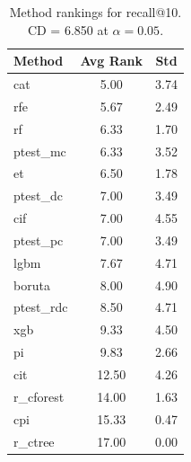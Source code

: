 \begin{table}[h]
\centering
\caption{Method rankings for recall@10. CD = 6.850 at $\alpha=0.05$.}
\label{tab:ranks_recall@10}
\begin{tabular}{lcc}
\toprule
Method & Avg Rank & Std \\
\midrule
cat & 5.00 & 3.74 \\
rfe & 5.67 & 2.49 \\
rf & 6.33 & 1.70 \\
ptest_mc & 6.33 & 3.52 \\
et & 6.50 & 1.78 \\
ptest_dc & 7.00 & 3.49 \\
cif & 7.00 & 4.55 \\
ptest_pc & 7.00 & 3.49 \\
lgbm & 7.67 & 4.71 \\
boruta & 8.00 & 4.90 \\
ptest_rdc & 8.50 & 4.71 \\
xgb & 9.33 & 4.50 \\
pi & 9.83 & 2.66 \\
cit & 12.50 & 4.26 \\
r_cforest & 14.00 & 1.63 \\
cpi & 15.33 & 0.47 \\
r_ctree & 17.00 & 0.00 \\
\bottomrule
\end{tabular}
\end{table}